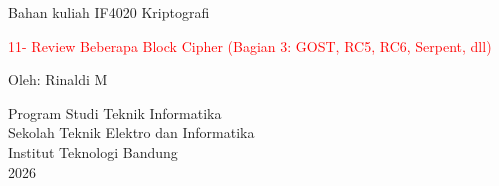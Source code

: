 \documentclass{article}
\begin{document}

\begin{center}
Bahan kuliah IF4020 Kriptografi

\huge \textcolor{red}{11- Review Beberapa Block Cipher}
\large \textcolor{red}{(Bagian 3: GOST, RC5, RC6, Serpent, dll)}

\vspace{20mm}

\large Oleh: Rinaldi M

\vspace{10mm}

Program Studi Teknik Informatika \\
Sekolah Teknik Elektro dan Informatika \\
Institut Teknologi Bandung \\
2026
\end{center}
\end{document}
